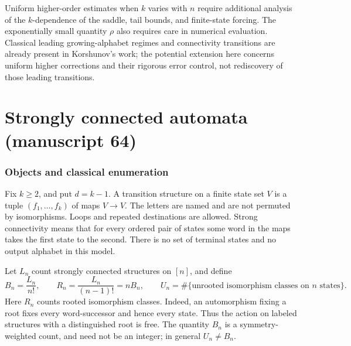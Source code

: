 \documentclass[11pt,letterpaper]{article}
\theoremstyle{remark}\newtheorem{remark}[theorem]{Remark}
\numberwithin{equation}{section}
\begin{document}
Uniform higher-order estimates when $k$ varies with $n$ require additional analysis of the $k$-dependence of the saddle, tail bounds, and finite-state forcing. The exponentially small quantity $\rho$ also requires care in numerical evaluation. Classical leading growing-alphabet regimes and connectivity transitions are already present in Korshunov's work; the potential extension here concerns uniform higher corrections and their rigorous error control, not rediscovery of those leading transitions.

\part{Strongly connected automata (manuscript 64)}

\section{Objects and classical enumeration}\label{asa:str:sec:objects}
Fix $k\ge2$, and put $d=k-1$. A transition structure on a finite state set $V$ is a tuple $(f_1,\ldots,f_k)$ of maps $V\to V$. The letters are named and are not permuted by isomorphisms. Loops and repeated destinations are allowed. Strong connectivity means that for every ordered pair of states some word in the maps takes the first state to the second. There is no set of terminal states and no output alphabet in this model.

Let $L_n$ count strongly connected structures on $[n]$, and define
\[
 B_n=\frac{L_n}{n!},\qquad R_n=\frac{L_n}{(n-1)!}=nB_n,
 \qquad U_n=\#\{\text{unrooted isomorphism classes on $n$ states}\}.
\]
Here $R_n$ counts rooted isomorphism classes. Indeed, an automorphism fixing a root fixes every word-successor and hence every state. Thus the action on labeled structures with a distinguished root is free. The quantity $B_n$ is a symmetry-weighted count, and need not be an integer; in general $U_n\ne B_n$.
\end{document}
